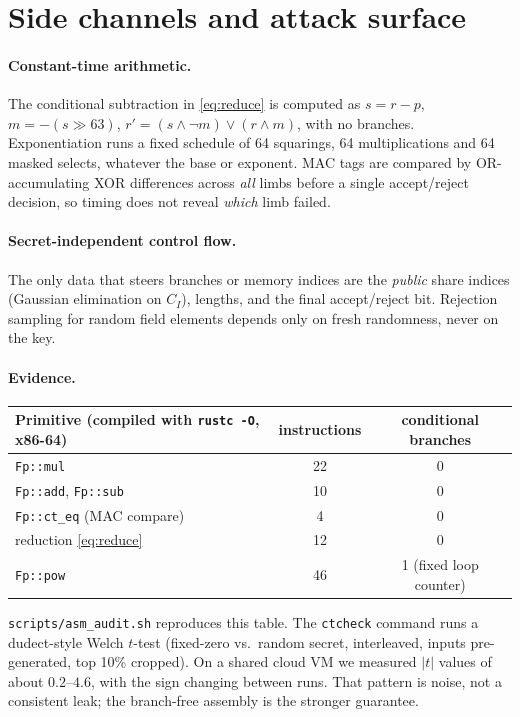 \documentclass[11pt]{article}
\theoremstyle{remark}
\begin{document}
\section{Side channels and attack surface}\label{sec:sidechannel}

\paragraph{Constant-time arithmetic.} The conditional subtraction in
\eqref{eq:reduce} is computed as $s = r - p$, $m = -(s\gg 63)$,
$r' = (s\wedge\neg m)\vee(r\wedge m)$, with no branches. Exponentiation runs a
fixed schedule of 64 squarings, 64 multiplications and 64 masked selects,
whatever the base or exponent. MAC tags are compared by OR-accumulating XOR
differences across \emph{all} limbs before a single accept/reject decision, so
timing does not reveal \emph{which} limb failed.

\paragraph{Secret-independent control flow.} The only data that steers branches or
memory indices are the \emph{public} share indices (Gaussian elimination on $C_I$),
lengths, and the final accept/reject bit. Rejection sampling for random field
elements depends only on fresh randomness, never on the key.

\paragraph{Evidence.}
\begin{center}
\begin{tabular}{lcc}
\toprule
Primitive (compiled with \texttt{rustc -O}, x86-64) & instructions & conditional branches\\
\midrule
\texttt{Fp::mul} & 22 & 0\\
\texttt{Fp::add}, \texttt{Fp::sub} & 10 & 0\\
\texttt{Fp::ct\_eq} (MAC compare) & 4 & 0\\
reduction \eqref{eq:reduce} & 12 & 0\\
\texttt{Fp::pow} & 46 & 1 (fixed loop counter)\\
\bottomrule
\end{tabular}
\end{center}
\texttt{scripts/asm\_audit.sh} reproduces this table. The \texttt{ctcheck} command
runs a dudect-style Welch $t$-test (fixed-zero vs.\ random secret, interleaved,
inputs pre-generated, top 10\% cropped). On a shared cloud VM we measured
$|t|$ values of about $0.2$--$4.6$, with the sign changing between runs. That
pattern is noise, not a consistent leak; the branch-free assembly is the stronger
guarantee.
\end{document}
